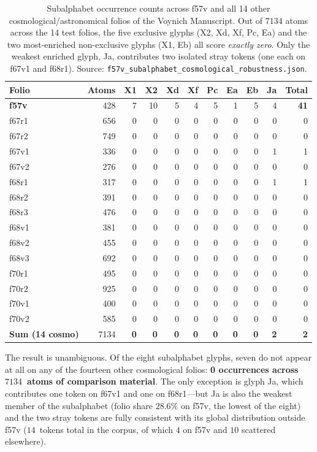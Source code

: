 \begin{table}[h]
\centering
\small
\begin{tabular}{lrrrrrrrrrr}
\toprule
Folio & Atoms & X1 & X2 & Xd & Xf & Pc & Ea & Eb & Ja & Total \\
\midrule
\textbf{f57v}  & 428 & 7 & 10 & 5 & 4 & 5 & 1 & 5 & 4 & \textbf{41} \\
\midrule
f67r1 & 656 & 0 & 0 & 0 & 0 & 0 & 0 & 0 & 0 & 0 \\
f67r2 & 749 & 0 & 0 & 0 & 0 & 0 & 0 & 0 & 0 & 0 \\
f67v1 & 336 & 0 & 0 & 0 & 0 & 0 & 0 & 0 & 1 & 1 \\
f67v2 & 276 & 0 & 0 & 0 & 0 & 0 & 0 & 0 & 0 & 0 \\
f68r1 & 317 & 0 & 0 & 0 & 0 & 0 & 0 & 0 & 1 & 1 \\
f68r2 & 391 & 0 & 0 & 0 & 0 & 0 & 0 & 0 & 0 & 0 \\
f68r3 & 476 & 0 & 0 & 0 & 0 & 0 & 0 & 0 & 0 & 0 \\
f68v1 & 381 & 0 & 0 & 0 & 0 & 0 & 0 & 0 & 0 & 0 \\
f68v2 & 455 & 0 & 0 & 0 & 0 & 0 & 0 & 0 & 0 & 0 \\
f68v3 & 692 & 0 & 0 & 0 & 0 & 0 & 0 & 0 & 0 & 0 \\
f70r1 & 495 & 0 & 0 & 0 & 0 & 0 & 0 & 0 & 0 & 0 \\
f70r2 & 925 & 0 & 0 & 0 & 0 & 0 & 0 & 0 & 0 & 0 \\
f70v1 & 400 & 0 & 0 & 0 & 0 & 0 & 0 & 0 & 0 & 0 \\
f70v2 & 585 & 0 & 0 & 0 & 0 & 0 & 0 & 0 & 0 & 0 \\
\midrule
\textbf{Sum (14 cosmo)} & 7134 & \textbf{0} & \textbf{0} & \textbf{0} & \textbf{0} & \textbf{0} & \textbf{0} & \textbf{0} & \textbf{2} & \textbf{2} \\
\bottomrule
\end{tabular}
\caption{Subalphabet occurrence counts across f57v and all 14 other
cosmological/astronomical folios of the Voynich Manuscript. Out of $7134$
atoms across the 14 test folios, the five exclusive glyphs (X2, Xd, Xf, Pc,
Ea) and the two most-enriched non-exclusive glyphs (X1, Eb) all score
\emph{exactly zero}. Only the weakest enriched glyph, Ja, contributes two
isolated stray tokens (one each on f67v1 and f68r1). Source:
\texttt{f57v\_subalphabet\_cosmological\_robustness.json}.}
\label{tab:cosmotest}
\end{table}

The result is unambiguous. Of the eight subalphabet glyphs, seven do not
appear at all on any of the fourteen other cosmological folios:
\textbf{0 occurrences across $7134$~atoms of comparison material}. The only
exception is glyph Ja, which contributes one token on f67v1 and one on
f68r1---but Ja is also the weakest member of the subalphabet (folio share
$28.6\%$ on f57v, the lowest of the eight) and the two stray tokens are
fully consistent with its global distribution outside f57v ($14$~tokens
total in the corpus, of which $4$ on f57v and $10$ scattered elsewhere).

